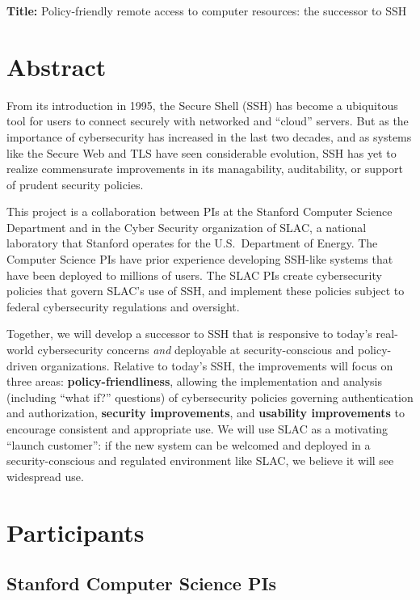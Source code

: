 \documentclass[10pt]{article}
\begin{document}
\noindent \textbf{Title:} Policy-friendly remote access to computer resources: the successor to SSH

\vspace{-.5\baselineskip}

\section*{Abstract}

From its introduction in 1995, the Secure Shell (SSH) has become a
ubiquitous tool for users to connect securely with networked and
``cloud'' servers. But as the importance of cybersecurity has
increased in the last two decades, and as systems like the Secure Web
and TLS have seen considerable evolution, SSH has yet to realize
commensurate improvements in its managability, auditability, or
support of prudent security policies.

This project is a collaboration between PIs at the Stanford Computer
Science Department and in the Cyber Security organization of SLAC, a
national laboratory that Stanford operates for the U.S.~Department of
Energy. The Computer Science PIs have prior experience developing
SSH-like systems that have been deployed to millions of users. The
SLAC PIs create cybersecurity policies that govern SLAC's use of SSH,
and implement these policies subject to federal cybersecurity regulations and oversight.

Together, we will develop a successor to SSH that is responsive to
today's real-world cybersecurity concerns \emph{and} deployable at
security-conscious and policy-driven organizations. Relative to
today's SSH, the improvements will focus on three areas:
\textbf{policy-friendliness}, allowing the implementation and analysis
(including ``what if?'' questions) of cybersecurity policies governing
authentication and authorization, \textbf{security improvements}, and
\textbf{usability improvements} to encourage consistent and
appropriate use. We will use SLAC as a motivating ``launch customer'':
if the new system can be welcomed and deployed in a security-conscious
and regulated environment like SLAC, we believe it will see widespread
use.

\vspace{-.5\baselineskip}

\section{Participants}

\subsection{Stanford Computer Science PIs}
\end{document}
